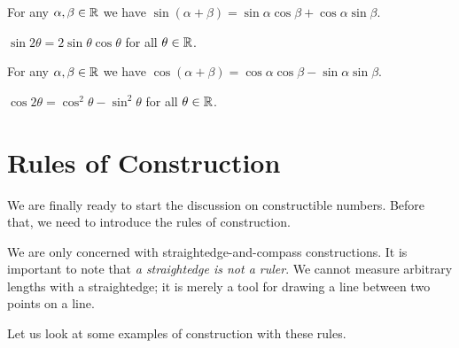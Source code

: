 \begin{theorem}\label{thrm-sine-sum-rule}
    For any $\alpha,\beta \in \mathbb{R}$ we have $\sin(\alpha+\beta) = \sin\alpha\cos\beta + \cos\alpha\sin\beta$.
\end{theorem}
\begin{corollary}
    $\sin2\theta = 2\sin\theta\cos\theta$ for all $\theta \in \mathbb{R}$.
\end{corollary}

\begin{theorem}\label{thrm-cosine-sum-rule}
    For any $\alpha,\beta \in \mathbb{R}$ we have $\cos(\alpha+\beta) = \cos\alpha\cos\beta - \sin\alpha\sin\beta$.
\end{theorem}
\begin{corollary}
    $\cos2\theta = \cos^2\theta - \sin^2\theta$ for all $\theta \in \mathbb{R}$.
\end{corollary}

\section{Rules of Construction}
We are finally ready to start the discussion on constructible numbers. Before that, we need to introduce the rules of construction.

We are only concerned with straightedge-and-compass constructions. It is important to note that \textit{a straightedge is not a ruler}. We cannot measure arbitrary lengths with a straightedge; it is merely a tool for drawing a line between two points on a line.

Let us look at some examples of construction with these rules.

